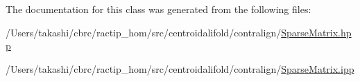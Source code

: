 The documentation for this class was generated from the following files\+:\begin{DoxyCompactItemize}
\item 
/\+Users/takashi/cbrc/ractip\+\_\+hom/src/centroidalifold/contralign/\hyperlink{_sparse_matrix_8hpp}{Sparse\+Matrix.\+hpp}\item 
/\+Users/takashi/cbrc/ractip\+\_\+hom/src/centroidalifold/contralign/\hyperlink{_sparse_matrix_8ipp}{Sparse\+Matrix.\+ipp}\end{DoxyCompactItemize}
